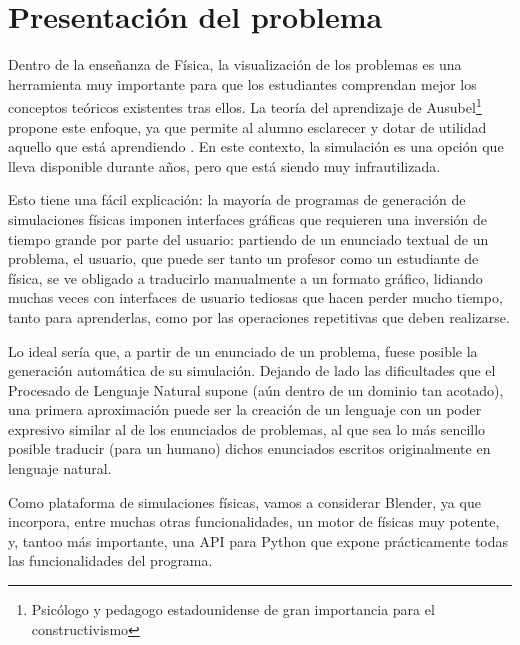 \documentclass[12pt]{article}
\begin{document}

\tableofcontents
\pagebreak
\listoftables
\pagebreak


\section{Presentación del problema}

Dentro de la enseñanza de Física, la visualización de los problemas es una herramienta muy importante para que los estudiantes comprendan mejor los conceptos teóricos existentes tras ellos. La teoría del aprendizaje de Ausubel\footnote{Psicólogo y pedagogo estadounidense de gran importancia para el constructivismo} propone este enfoque, ya que permite al alumno esclarecer y dotar de utilidad aquello que está aprendiendo \cite{ausubel1983teoria}. En este contexto, la simulación es una opción que lleva disponible durante años, pero que está siendo muy infrautilizada.

Esto tiene una fácil explicación: la mayoría de programas de generación de simulaciones físicas imponen interfaces gráficas que requieren una inversión de tiempo grande por parte del usuario: partiendo de un enunciado textual de un problema, el usuario, que puede ser tanto un profesor como un estudiante de física, se ve obligado a traducirlo manualmente a un formato gráfico, lidiando muchas veces con interfaces de usuario tediosas que hacen perder mucho tiempo, tanto para aprenderlas, como por las operaciones repetitivas que deben realizarse. 

Lo ideal sería que, a partir de un enunciado de un problema, fuese posible la generación automática de su simulación. Dejando de lado las dificultades que el Procesado de Lenguaje Natural supone (aún dentro de un dominio tan acotado), una primera aproximación puede ser la creación de un lenguaje con un poder expresivo similar al de los enunciados de problemas, al que sea lo más sencillo posible traducir (para un humano) dichos enunciados escritos originalmente en lenguaje natural.

Como plataforma de simulaciones físicas, vamos a considerar Blender, ya que incorpora, entre muchas otras funcionalidades, un motor de físicas muy potente, y, tantoo más importante, una API para Python que expone prácticamente todas las funcionalidades del programa.
\end{document}
